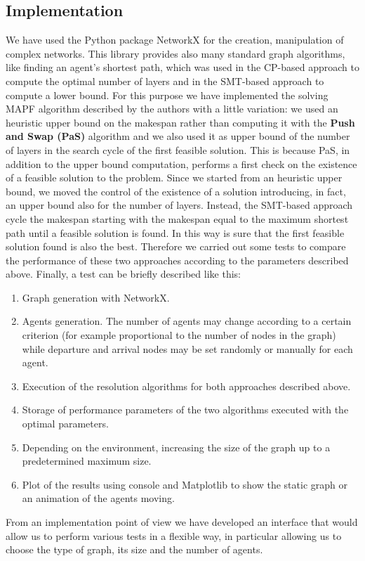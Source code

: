 \documentclass[12pt, a4paper, hidelinks]{article}
\numberwithin{equation}{section}
\begin{document}
\subsection{Implementation}\label{subsec:implementation}
We have used the Python package NetworkX for the creation, manipulation of complex networks.
This library provides also many standard graph algorithms, like finding an agent's shortest path, which was used in the CP-based approach to compute the optimal number of layers and in the SMT-based approach to compute a lower bound.
For this purpose we have implemented the solving MAPF algorithm described by the authors with a little variation:
we used an heuristic upper bound on the makespan rather than computing it with the \textbf{Push and Swap (PaS)} algorithm and we also used it as upper bound of the number of layers in the search cycle of the first feasible solution.
This is because PaS, in addition to the upper bound computation, performs a first check on the existence of a feasible solution to the problem.
Since we started from an heuristic upper bound, we moved the control of the existence of a solution introducing, in fact, an upper bound also for the number of layers.
Instead, the SMT-based approach cycle the makespan starting with the makespan equal to the maximum shortest path until a feasible solution is found.
In this way is sure that the first feasible solution found is also the best.
Therefore we carried out some tests to compare the performance of these two approaches according to the parameters described above.
Finally, a test can be briefly described like this:
\begin{enumerate}
    \item Graph generation with NetworkX\@.
    \item Agents generation.
The number of agents may change according to a certain criterion (for example proportional to the number of nodes in the graph) while departure and arrival nodes may be set randomly or manually for each agent.
    \item Execution of the resolution algorithms for both approaches described above.
    \item Storage of performance parameters of the two algorithms executed with the optimal parameters.
    \item Depending on the environment, increasing the size of the graph up to a predetermined maximum size.
    \item Plot of the results using console and Matplotlib to show the static graph or an animation of the agents moving.
\end{enumerate}
From an implementation point of view we have developed an interface that would allow us to perform various tests in a flexible way, in particular allowing us to choose the type of graph, its size and the number of agents.
\end{document}
